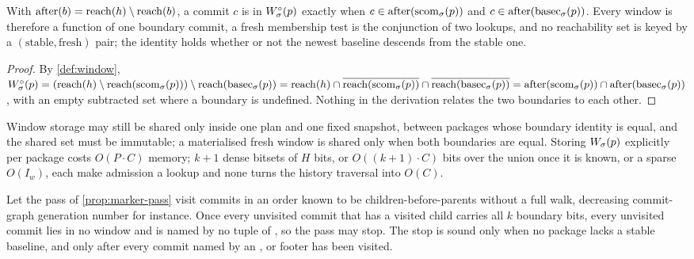 \begin{corollary}
\label{cor:fresh-identity}
With $\mathrm{after}(b) = \mathrm{reach}(h) \setminus \mathrm{reach}(b)$, a commit $c$ is in
$W^{\circ}_{\sigma}(p)$ exactly when $c \in \mathrm{after}(\mathrm{scom}_{\sigma}(p))$ and $c
\in \mathrm{after}(\mathrm{basec}_{\sigma}(p))$. Every window is therefore a function of
one boundary commit, a fresh membership test is the conjunction of two
lookups, and no reachability set is keyed by a $(\text{stable}, \text{fresh})$
pair; the identity holds whether or not the newest baseline descends from the
stable one.
\end{corollary}

\begin{proof}
By \cref{def:window}, $W^{\circ}_{\sigma}(p) = (\mathrm{reach}(h) \setminus
\mathrm{reach}(\mathrm{scom}_{\sigma}(p))) \setminus \mathrm{reach}(\mathrm{basec}_{\sigma}(p)) = \mathrm{reach}(h) \cap
\overline{\mathrm{reach}(\mathrm{scom}_{\sigma}(p))} \cap \overline{\mathrm{reach}(\mathrm{basec}_{\sigma}(p))} =
\mathrm{after}(\mathrm{scom}_{\sigma}(p)) \cap \mathrm{after}(\mathrm{basec}_{\sigma}(p))$, with
an empty subtracted set where a boundary is undefined. Nothing in the
derivation relates the two boundaries to each other.
\end{proof}

Window storage may still be shared only inside one plan and one fixed
snapshot, between packages whose boundary identity is equal, and the shared
set must be immutable; a materialised fresh window is shared only when both
boundaries are equal. Storing $W_{\sigma}(p)$ explicitly per package costs
$O(P \cdot C)$ memory; $k + 1$ dense bitsets of $H$ bits, or $O((k+1) \cdot
C)$ bits over the union once it is known, or a sparse $O(I_w)$, each make
admission a lookup and none turns the history traversal into $O(C)$.

\begin{proposition}
\label{prop:early-stop}
Let the pass of \cref{prop:marker-pass} visit commits in an order known to be
children-before-parents without a full walk, decreasing commit-graph
generation number for instance. Once every unvisited commit that has a visited
child carries all $k$ boundary bits, every unvisited commit lies in no
window and is named by no tuple of , so the pass may stop. The stop
is sound only when no package lacks a stable baseline, and only after every
commit named by an ,  or  footer has
been visited.
\end{proposition}

